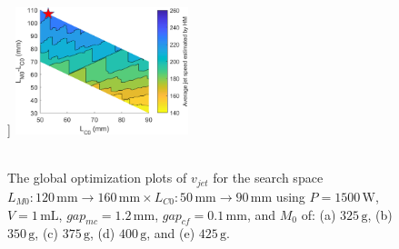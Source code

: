 \begin{figure}[!ht]
            ]{
                \includegraphics[width=0.45\textwidth]{chap3/images/PMLSM_HM_375g.png}
                \label{fig:chapter/hm/optimiization/375}
            }
            \qquad
            \\
            \\
            \caption{
                The global optimization plots of $v_{jet}$ for the search space $L_{M0}:120\,\mathrm{mm}\rightarrow 160\,\mathrm{mm} \times L_{C0}:50\,\mathrm{mm}\rightarrow 90\,\mathrm{mm}$ using $P=1500\,\mathrm{W}$, $V=1\,\mathrm{mL}$, $gap_{mc}=1.2\,\mathrm{mm}$, $gap_{cf}=0.1\,\mathrm{mm}$,  and $M_0$ of: (a) $325\,\mathrm{g}$, (b) $350\,\mathrm{g}$, (c) $375\,\mathrm{g}$, (d) $400\,\mathrm{g}$, and (e) $425\,\mathrm{g}$.
            }   \label{fig:chapter/hm/optimization search space result for differnt mass}
        \end{figure}
        
